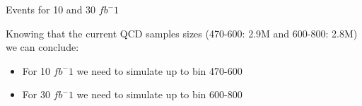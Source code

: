 \documentclass[8pt]{beamer}
\begin{document}
\begin{frame}{Events for 10 and 30 $fb^-1$}

\begin{block}



\end{block}
  
Knowing that the current QCD samples sizes (470-600: 2.9M and 600-800: 2.8M) we can conclude:
\begin{itemize}
  \item For 10 $fb^-1$ we need to simulate up to bin 470-600
  \item For 30 $fb^-1$ we need to simulate up to bin 600-800
\end{itemize}

\end{frame}
\end{document}
